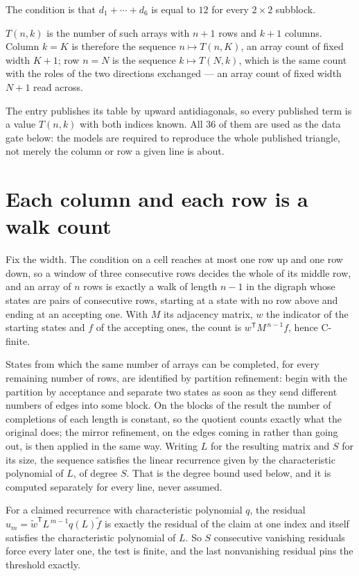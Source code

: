 \documentclass[11pt]{article}
\theoremstyle{definition}
\begin{document}
The condition is that $d_1+\cdots+d_6$ is equal to $12$ for every $2\times2$ subblock.

$T(n,k)$ is the number of such arrays with $n + 1$ rows and $k + 1$ columns. Column $k = K$ is therefore the sequence $n \mapsto T(n,K)$, an array count of fixed width $K + 1$; row $n = N$ is the sequence $k \mapsto T(N,k)$, which is the same count with the roles of the two directions exchanged --- an array count of fixed width $N + 1$ read across.

The entry publishes its table by upward antidiagonals, so every published term is a value $T(n,k)$ with both indices known. All 36 of them are used as the data gate below: the models are required to reproduce the whole published triangle, not merely the column or row a given line is about.

\section{Each column and each row is a walk count}

Fix the width. The condition on a cell reaches at most one row up and one row down, so a window of three consecutive rows decides the whole of its middle row, and an array of $n$ rows is exactly a walk of length $n-1$ in the digraph whose states are pairs of consecutive rows, starting at a state with no row above and ending at an accepting one. With $M$ its adjacency matrix, $w$ the indicator of the starting states and $f$ of the accepting ones, the count is $w^{\mathsf T}M^{\,n-1}f$, hence C-finite.

States from which the same number of arrays can be completed, for every remaining number of rows, are identified by partition refinement: begin with the partition by acceptance and separate two states as soon as they send different numbers of edges into some block. On the blocks of the result the number of completions of each length is constant, so the quotient counts exactly what the original does; the mirror refinement, on the edges coming in rather than going out, is then applied in the same way. Writing $L$ for the resulting matrix and $S$ for its size, the sequence satisfies the linear recurrence given by the characteristic polynomial of $L$, of degree $S$. That is the degree bound used below, and it is computed separately for every line, never assumed.

For a claimed recurrence with characteristic polynomial $q$, the residual $u_m = \tilde w^{\mathsf T}L^{\,m-1}q(L)\tilde f$ is exactly the residual of the claim at one index and itself satisfies the characteristic polynomial of $L$. So $S$ consecutive vanishing residuals force every later one, the test is finite, and the last nonvanishing residual pins the threshold exactly.
\end{document}
